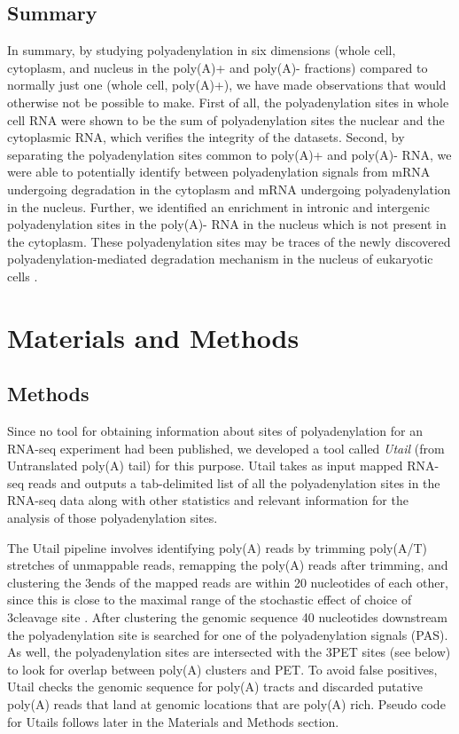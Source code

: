 \subsection{Summary}
In summary, by studying polyadenylation in six dimensions (whole cell,
cytoplasm, and nucleus in the poly(A)+ and poly(A)- fractions) compared to
normally just one (whole cell, poly(A)+), we have made observations that would
otherwise not be possible to make. First of all, the polyadenylation sites in
whole cell RNA were shown to be the sum of polyadenylation sites the nuclear
and the cytoplasmic RNA, which verifies the integrity of the datasets. Second,
by separating the polyadenylation sites common to poly(A)+ and poly(A)- RNA, we
were able to potentially identify between polyadenylation signals from mRNA
undergoing degradation in the cytoplasm and mRNA undergoing polyadenylation in
the nucleus. Further, we identified an enrichment in intronic and intergenic
polyadenylation sites in the poly(A)- RNA in the nucleus which is not present
in the cytoplasm. These polyadenylation sites may be traces of the newly
discovered polyadenylation-mediated degradation mechanism in the nucleus of
eukaryotic cells \cite{lemay_nuclear_2010}.  

\section{Materials and Methods}
\subsection{Methods}
Since no tool for obtaining information about sites of polyadenylation for an
RNA-seq experiment had been published, we developed a tool called
\textit{Utail} (from Untranslated poly(A) tail) for this purpose. Utail takes
as input mapped RNA-seq reads and outputs a tab-delimited list of all the
polyadenylation sites in the RNA-seq data along with other statistics and
relevant information for the analysis of those polyadenylation sites.

The Utail pipeline involves identifying poly(A) reads by trimming poly(A/T)
stretches of unmappable reads, remapping the poly(A) reads after trimming, and
clustering the 3\ppp ends of the mapped reads are within 20 nucleotides of each
other, since this is close to the maximal range of the stochastic effect of
choice of 3\ppp cleavage site \cite{tian_large-scale_2005}. After clustering
the genomic sequence 40 nucleotides downstream the polyadenylation site is
searched for one of the polyadenylation signals (PAS). As well, the
polyadenylation sites are intersected with the 3\ppp PET sites (see below) to
look for overlap between poly(A) clusters and PET. To avoid false positives,
Utail checks the genomic sequence for poly(A) tracts and discarded putative
poly(A) reads that land at genomic locations that are poly(A) rich. Pseudo code
for Utails follows later in the Materials and Methods section.

